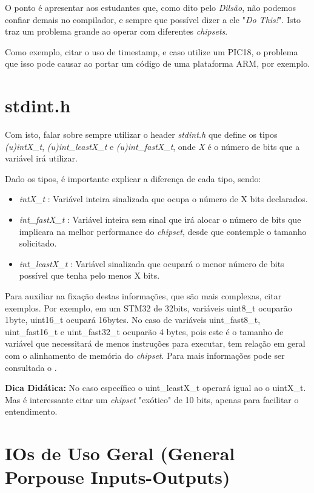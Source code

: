 \documentclass[12pt,a4paper]{report}
\begin{document}
O ponto é apresentar aos estudantes que, como dito pelo \textit{Dilsão}, não podemos confiar demais no compilador, e sempre que possível dizer a ele "\textit{Do This!}". Isto traz um problema grande ao operar com diferentes \textit{chipsets}.

Como exemplo, citar o uso de timestamp, e caso utilize um PIC18, o problema que isso pode causar ao portar um código de uma plataforma ARM, por exemplo.

\section{stdint.h}

Com isto, falar sobre sempre utilizar o header \textit{stdint.h} que define os tipos \textit{(u)intX\_t}, \textit{(u)int\_leastX\_t} e \textit{(u)int\_fastX\_t}, onde \textit{X} é o número de bits que a variável irá utilizar.

Dado os tipos, é importante explicar a diferença de cada tipo, sendo:

\begin{itemize}
    \item \textit{intX\_t} : Variável inteira sinalizada que ocupa o número de X bits declarados.
    \item \textit{int\_fastX\_t} : Variável inteira sem sinal que irá alocar o número de bits que implicara na melhor performance do \textit{chipset}, desde que contemple o tamanho solicitado.
    \item \textit{int\_leastX\_t} : Variável sinalizada que ocupará o menor número de bits possível que tenha pelo menos X bits.
\end{itemize}

Para auxiliar na fixação destas informações, que são mais complexas, citar exemplos. Por exemplo, em um STM32 de 32bits, variáveis uint8\_t ocuparão 1byte, uint16\_t ocupará 16bytes. No caso de variáveis uint\_fast8\_t, uint\_fast16\_t e uint\_fast32\_t ocuparão 4 bytes, pois este é o tamanho de variável que necessitará de menos instruções para executar, tem relação em geral com o alinhamento de memória do \textit{chipset}. Para mais informações pode ser consultada o \cite{ci:diff_uint}.

\textbf{Dica Didática:} No caso específico o uint\_leastX\_t operará igual ao o uintX\_t. Mas é interessante citar um \textit{chipset} "exótico" de 10 bits, apenas para facilitar o entendimento.

\section{IOs de Uso Geral (General Porpouse Inputs-Outputs)}
\end{document}
